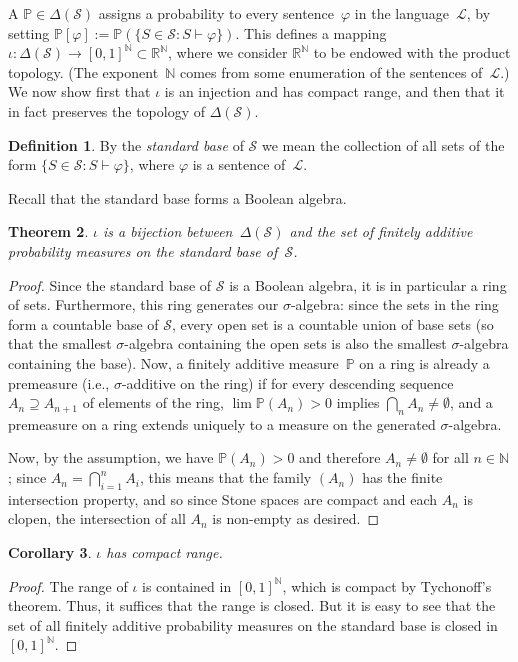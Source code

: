 \documentclass[12pt]{article}
\newcommand{\PP}{\mathbb{P}}
\newcommand{\vp}{\varphi}
\newcommand{\RR}{\mathbb{R}}
\newcommand{\NN}{\mathbb{N}}
\newcommand{\cL}{\mathcal{L}}
\newcommand{\cS}{\mathcal{S}}
\theoremstyle{plain}
\newtheorem{theorem}{Theorem}[subsection]
\newtheorem{corollary}[theorem]{Corollary}
\theoremstyle{definition}
\newtheorem{definition}[theorem]{Definition}
\theoremstyle{remark}
\begin{document}
A $\PP\in\Delta(\cS)$ assigns a probability to every sentence~$\vp$ in the language~$\cL$, by setting $\PP[\vp] := \PP(\{S\in\cS:S\vdash\vp\})$. This defines a mapping $\iota : \Delta(\cS)\to [0,1]^\NN\subset\RR^\NN$, where we consider $\RR^\NN$ to be endowed with the product topology. (The exponent~$\NN$ comes from some enumeration of the sentences of~$\cL$.) We now show first that $\iota$ is an injection and has compact range, and then that it in fact preserves the topology of $\Delta(\cS)$.
\begin{definition}
By the \emph{standard base} of $\cS$ we mean the collection of all sets of the form $\{S\in\cS : S\vdash\vp\}$, where $\vp$ is a sentence of~$\cL$.
\end{definition}
Recall that the standard base forms a Boolean algebra.
\begin{theorem}
$\iota$ is a bijection between~$\Delta(\cS)$ and the set of finitely additive probability measures on the standard base of~$\cS$.
\end{theorem}
\begin{proof}
Since the standard base of $\cS$ is a Boolean algebra, it is in particular a ring of sets. Furthermore, this ring generates our $\sigma$-algebra: since the sets in the ring form a countable base of $\cS$, every open set is a countable union of base sets (so that the smallest $\sigma$-algebra containing the open sets is also the smallest $\sigma$-algebra containing the base).
Now, a finitely additive measure~$\PP$ on a ring is already a premeasure (i.e., $\sigma$-additive on the ring) if for every descending sequence $A_n\supseteq A_{n+1}$ of elements of the ring, $\lim \PP(A_n) > 0$ implies $\textstyle\bigcap_n A_n \neq\emptyset$, and a premeasure on a ring extends uniquely to a measure on the generated $\sigma$-algebra. 

Now, by the assumption, we have $\PP(A_n) > 0$ and therefore $A_n\neq\emptyset$ for all $n\in\mathbb{N}$; since $\textstyle A_n = \bigcap_{i=1}^n A_i$, this means that the family $(A_n)$ has the finite intersection property, and so since Stone spaces are compact and each $A_n$ is clopen, the intersection of all $A_n$ is non-empty as desired.
\end{proof}
\begin{corollary}
$\iota$ has compact range.
\end{corollary}
\begin{proof}
The range of $\iota$ is contained in $[0,1]^\NN$, which is compact by Tychonoff's theorem. Thus, it suffices that the range is closed. But it is easy to see that the set of all finitely additive probability measures on the standard base is closed in $[0,1]^\NN$.
\end{proof}
\end{document}
